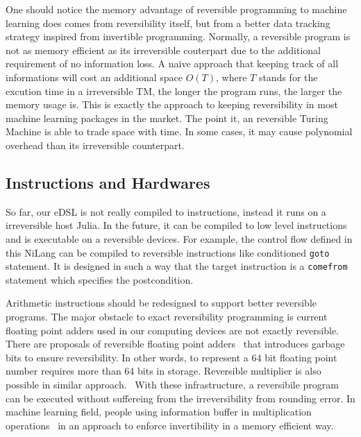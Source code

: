 \documentclass[aps,twocolumn,longbibliography,english,superscriptaddress,prr]{revtex4-1}
\newcommand{\<}{\langle}
\renewcommand{\>}{\rangle}
\theoremstyle{definition}\newtheorem{definition}{\textit{Definition}}
\begin{document}
One should notice the memory advantage of reversible programming to machine learning does comes from reversibility itself, but from a better data tracking strategy inspired from invertible programming.
Normally, a reversible program is not as memory efficient as its irreversible couterpart due to the additional requirement of no information loss. A naive approach that keeping track of all informations will cost an additional space $O(T)$, where $T$ stands for the excution time in a irreversible TM, the longer the program runs, the larger the memory usage is. This is exactly the approach to keeping reversibility in most machine learning packages in the market.
The point it, an reversible Turing Machine is able to trade space with time.
In some cases, it may cause polynomial overhead than its irreversible counterpart.

\subsection{Instructions and Hardwares}
So far, our eDSL is not really compiled to instructions, instead it runs on a irreversible host Julia.
In the future, it can be compiled to low level instructions and is executable on a reversible devices.
For example, the control flow defined in this NiLang can be compiled to reversible instructions like conditioned \texttt{goto} statement.
It is designed in such a way that the target instruction is a \texttt{comefrom} statement which specifies the postcondition. ~\cite{Vieri1999}

Arithmetic instructions should be redesigned to support better reversible programs.
The major obstacle to exact reversibility programming is current floating point adders used in our computing devices are not exactly reversible.
There are proposals of reversible floating point adders~\cite{Nachtigal2011,Nguyen2013} that introduces garbage bits to ensure reversibility.
In other words, to represent a 64 bit floating point number requires more than 64 bits in storage. Reversible multiplier is also possible in similar approach.~\cite{Nachtigal2010} With these infrastructure, a reversibile program can be executed without suffereing from the irreversibility from rounding error.
In machine learning field, people using information buffer in multiplication operations~\cite{Maclaurin2015} in an approach to enforce invertibility in a memory efficient way.
\end{document}
